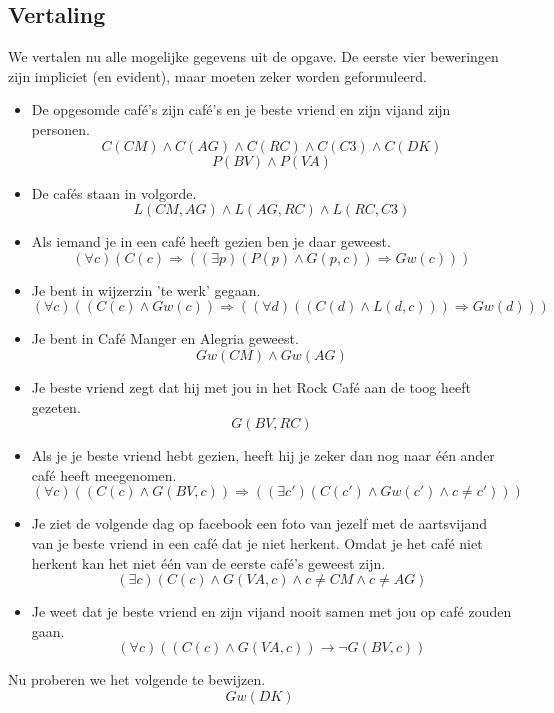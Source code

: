\documentclass[alternative-exam.tex]{subfiles}
\begin{document}
\subsection{Vertaling}
We vertalen nu alle mogelijke gegevens uit de opgave. De eerste vier beweringen zijn impliciet (en evident), maar moeten zeker worden geformuleerd.
\begin{itemize}
\item De opgesomde caf\'e's zijn caf\'e's en je beste vriend en zijn vijand zijn personen.
\[ C(CM)\wedge C(AG)\wedge C(RC)\wedge C(C3)\wedge C(DK) \]
\[ P(BV) \wedge P(VA)\]
\item De caf\'es staan in volgorde.
\[
L(CM,AG) \wedge L(AG,RC) \wedge L(RC,C3)
\]
\item Als iemand je in een caf\'e heeft gezien ben je daar geweest.
\[
(\forall c)(C(c) \Rightarrow ((\exists p) (P(p) \wedge G(p,c)) \Rightarrow Gw(c)))
\]
\item Je bent in wijzerzin 'te werk' gegaan.
\[
(\forall c)(( C(c) \wedge Gw(c)) \Rightarrow ((\forall d)(( C(d) \wedge L(d,c)))\Rightarrow Gw(d)))
\]
\item Je bent in Caf\'e Manger en Alegria geweest.
\[
Gw(CM) \wedge Gw(AG)
\]
\item Je beste vriend zegt dat hij met jou in het Rock Caf\'e aan de toog heeft gezeten.
\[
G(BV,RC)
\]
\item Als je je beste vriend hebt gezien, heeft hij je zeker dan nog naar \'e\'en ander caf\'e heeft meegenomen.
\[
(\forall c) ((C(c) \wedge G(BV,c)) \Rightarrow ((\exists c') (C(c') \wedge Gw(c') \wedge c \neq c')))
\]
\item Je ziet de volgende dag op facebook een foto van jezelf met de aartsvijand van je beste vriend in een caf\'e dat je niet herkent. Omdat je het caf\'e niet herkent kan het niet \'e\'en van de eerste caf\'e's geweest zijn. 
\[
(\exists c) (C(c) \wedge G(VA,c) \wedge c\neq CM \wedge c \neq AG)
\]
\item Je weet dat je beste vriend en zijn vijand nooit samen met jou op caf\'e zouden gaan.
\[
(\forall c) ((C(c) \wedge G(VA,c)) \rightarrow \neg G(BV,c))
\]
\end{itemize}
Nu proberen we het volgende te bewijzen.
\[
Gw(DK)
\]
\end{document}
